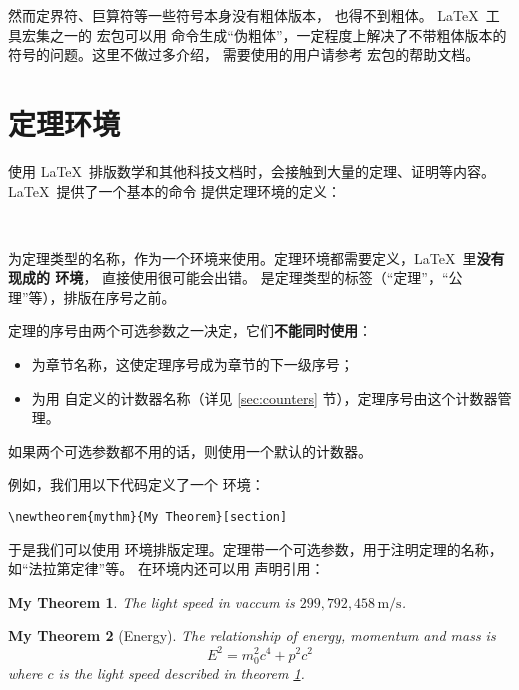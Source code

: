 然而定界符、巨算符等一些符号本身没有粗体版本， 也得不到粗体。
\LaTeX\ 工具宏集之一的  宏包可以用  命令生成“伪粗体”，一定程度上解决了不带粗体版本的符号的问题。这里不做过多介绍，
需要使用的用户请参考  宏包的帮助文档。

\section{定理环境}\label{sec:theorems}

使用 \LaTeX\ 排版数学和其他科技文档时，会接触到大量的定理、证明等内容。
\LaTeX\ 提供了一个基本的命令  提供定理环境的定义：
\begin{command}
 \\
\end{command}

 为定理类型的名称，作为一个环境来使用。定理环境都需要定义，\LaTeX\ 里\textbf{没有现成的  环境}，
直接使用很可能会出错。 是定理类型的标签（“定理”，“公理”等），排版在序号之前。

定理的序号由两个可选参数之一决定，它们\textbf{不能同时使用}：
\begin{itemize}
  \item {} 为章节名称，这使定理序号成为章节的下一级序号；
  \item {} 为用  自定义的计数器名称（详见 \ref{sec:counters} 节），定理序号由这个计数器管理。
\end{itemize}

如果两个可选参数都不用的话，则使用一个默认的计数器。

例如，我们用以下代码定义了一个  环境：
\begin{verbatim}
\newtheorem{mythm}{My Theorem}[section]
\end{verbatim}

于是我们可以使用  环境排版定理。定理带一个可选参数，用于注明定理的名称，如“法拉第定律”等。
在环境内还可以用  声明引用：
\begin{example}
\newtheorem{mythm}{My Theorem}[section]
\begin{mythm}\label{thm:light}
The light speed in vaccum
is $299,792,458\,\mathrm{m/s}$.
\end{mythm}
\begin{mythm}[Energy]
The relationship of energy, 
momentum and mass is 
\[E^2 = m_0^2 c^4 + p^2 c^2\]
where $c$ is the light speed 
described in theorem \ref{thm:light}.
\end{mythm}
\end{example}

